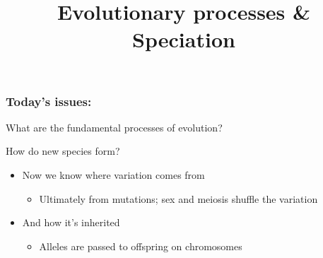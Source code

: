 



% 

\title[Evolutionary processes \& Speciation]{Evolutionary processes \& Speciation}
\date{}



\maketitle

\begin{frame}
\frametitle{Today's issues:}
What are the fundamental processes of evolution?

\vspace{2cm}
How do new species form?
\end{frame}

\begin{frame}
\begin{adjustwidth}{-1.5em}{-1.5em}
    \begin{itemize}
        \item<1-> Now we know where variation comes from
        \begin{itemize}
            \item<2-> Ultimately from mutations; sex and meiosis shuffle the variation
        \end{itemize}
        \item<3-> And how it's inherited
        \begin{itemize}
            \item<4-> Alleles are passed to offspring on chromosomes 
        \end{itemize}
    \end{itemize}

    \vspace{2cm}
\end{adjustwidth}
\end{frame}


